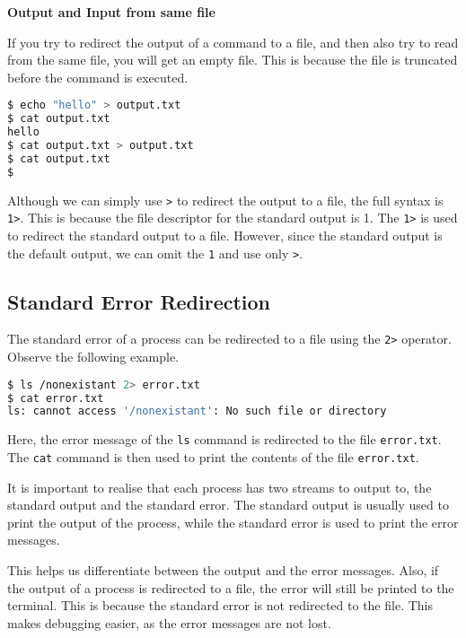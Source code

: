 \textbf{Output and Input from same file}

If you try to redirect the output of a command to a file, and then
also try to read from the same file, you will get an empty file.
This is because the file is truncated before the command is executed.

\begin{lstlisting}[language=bash]
$ echo "hello" > output.txt
$ cat output.txt
hello
$ cat output.txt > output.txt
$ cat output.txt
$
\end{lstlisting}

\begin{remark}
  Although we can simply use \lstinline|>| to redirect the output to a file,
  the full syntax is \lstinline|1>|. This is because the file descriptor
  for the standard output is 1. The \lstinline|1>| is used to redirect
  the standard output to a file. However, since the standard output
  is the default output, we can omit the \lstinline|1| and use only \lstinline|>|.
\end{remark}

\subsection{Standard Error Redirection}

The standard error of a process can be redirected to a file using the
\lstinline|2>| operator. Observe the following example.

\begin{lstlisting}[language=bash]
$ ls /nonexistant 2> error.txt
$ cat error.txt
ls: cannot access '/nonexistant': No such file or directory
\end{lstlisting}

Here, the error message of the \lstinline|ls| command is redirected to the
file \lstinline|error.txt|. The \lstinline|cat| command is then used to print
the contents of the file \lstinline|error.txt|.

It is important to realise that each process has two streams to output
to, the standard output and the standard error. The standard output is
usually used to print the output of the process, while the standard error
is used to print the error messages.

This helps us differentiate between the output and the error messages.
Also, if the output of a process is redirected to a file, the error
will still be printed to the terminal. This is because the standard
error is not redirected to the file. This makes debugging easier, as
the error messages are not lost.

